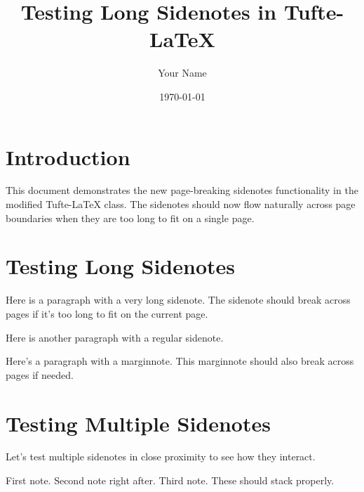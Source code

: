 \documentclass{tufte-handout}
\title{Testing Long Sidenotes in Tufte-LaTeX}
\author{Your Name}
\date{\today}
\begin{document}
\maketitle

\section{Introduction}

This document demonstrates the new page-breaking sidenotes functionality in the modified Tufte-LaTeX class. The sidenotes should now flow naturally across page boundaries when they are too long to fit on a single page.

\section{Testing Long Sidenotes}

Here is a paragraph with a very long sidenote.\sidenote{\lipsum[1]} The sidenote should break across pages if it's too long to fit on the current page.

\lipsum[3]

Here is another paragraph with a regular sidenote.

\lipsum[4]

Here's a paragraph with a marginnote.\marginnote{\lipsum[5]} This marginnote should also break across pages if needed.

\lipsum[6-8]

\section{Testing Multiple Sidenotes}

Let's test multiple sidenotes in close proximity to see how they interact.

First note. Second note right after. Third note.\sidenote{\lipsum[9]} These should stack properly.

\lipsum[10-12]
\end{document}
